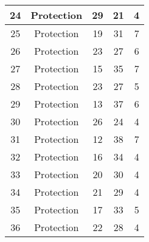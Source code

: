 \documentclass[results.tex]{subfiles}
\begin{document}
\begin{center}
\begin{tabular}{| c || c | c | c | c |}
            \hline
            24                      & Protection                   & 29                     & 21                      & 4                    \\
            \hline
            25                      & Protection                   & 19                     & 31                      & 7                    \\
            \hline
            26                      & Protection                   & 23                     & 27                      & 6                    \\
            \hline
            27                      & Protection                   & 15                     & 35                      & 7                    \\
            \hline
            28                      & Protection                   & 23                     & 27                      & 5                    \\
            \hline
            29                      & Protection                   & 13                     & 37                      & 6                    \\
            \hline
            30                      & Protection                   & 26                     & 24                      & 4                    \\
            \hline
            31                      & Protection                   & 12                     & 38                      & 7                    \\
            \hline
            32                      & Protection                   & 16                     & 34                      & 4                    \\
            \hline
            33                      & Protection                   & 20                     & 30                      & 4                    \\
            \hline
            34                      & Protection                   & 21                     & 29                      & 4                    \\
            \hline
            35                      & Protection                   & 17                     & 33                      & 5                    \\
            \hline
            36                      & Protection                   & 22                     & 28                      & 4                    \\

\end{tabular}
\end{center}
\end{document}
